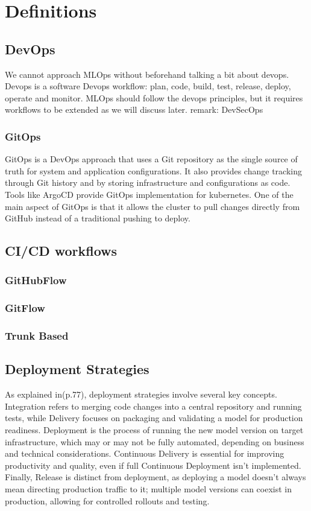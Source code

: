 \section{Definitions}\label{sec:stdefinitions}
\subsection{DevOps}
We cannot approach MLOps without beforehand talking a bit about devops.
Devops is a software
Devops workflow: plan, code, build, test, release, deploy, operate and monitor.
MLOps should follow the devops principles, but it requires workflows to be extended as we will discuss later.
remark: DevSecOps

\subsubsection{GitOps}
GitOps is a DevOps approach that uses a Git repository as the single source of truth for system and application configurations.
It also provides change tracking through Git history and by storing infrastructure and configurations as code.
Tools like ArgoCD provide GitOps implementation for kubernetes\cite{gitops}.
One of the main aspect of GitOps is that it allows the cluster to pull changes directly from GitHub instead of a
traditional pushing to deploy.


\subsection{CI/CD workflows}
\subsubsection{GitHubFlow}
\subsubsection{GitFlow}
\subsubsection{Trunk Based}
\subsection{Deployment Strategies}

As explained in\cite{treveil2020introducing}(p.77), deployment strategies involve several key concepts.
Integration refers to merging code changes into a central repository and running tests,
while Delivery focuses on packaging and validating a model for production readiness.
Deployment is the process of running the new model version on target infrastructure,
which may or may not be fully automated, depending on business and technical considerations.
Continuous Delivery is essential for improving productivity and quality, even if full Continuous Deployment isn't implemented.
Finally, Release is distinct from deployment, as deploying a model doesn't always mean directing production traffic to it;
multiple model versions can coexist in production, allowing for controlled rollouts and testing.

